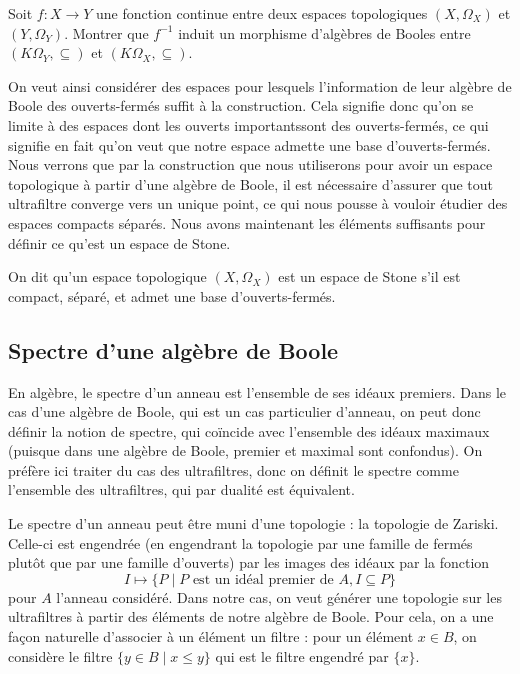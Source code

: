 \begin{exercise}
  Soit $f : X \to Y$ une fonction continue entre deux espaces topologiques
  $(X,\Omega_X)$ et $(Y,\Omega_Y)$. Montrer que $f^{-1}$ induit un morphisme
  d'algèbres de Booles entre $(K\Omega_Y,\subseteq)$ et
  $(K\Omega_X,\subseteq)$.
\end{exercise}

On veut ainsi considérer des espaces pour lesquels l'information de leur algèbre
de Boole des ouverts-fermés suffit à la construction. Cela signifie donc qu'on
se limite à des espaces dont les ouverts \og importants\fg sont des
ouverts-fermés, ce qui signifie en fait qu'on veut que notre espace admette une
base d'ouverts-fermés. Nous verrons que par la construction que nous utiliserons
pour avoir un espace topologique à partir d'une algèbre de Boole, il est
nécessaire d'assurer que tout ultrafiltre converge vers un unique point, ce qui
nous pousse à vouloir étudier des espaces compacts séparés. Nous avons
maintenant les éléments suffisants pour définir ce qu'est un espace de Stone.

\begin{definition}
  On dit qu'un espace topologique $(X,\Omega_X)$ est un espace de Stone s'il
  est compact, séparé, et admet une base d'ouverts-fermés.
\end{definition}

\subsection{Spectre d'une algèbre de Boole}

En algèbre, le spectre d'un anneau est l'ensemble de ses idéaux premiers. Dans
le cas d'une algèbre de Boole, qui est un cas particulier d'anneau, on peut donc
définir la notion de spectre, qui coïncide avec l'ensemble des idéaux maximaux
(puisque dans une algèbre de Boole, premier et maximal sont confondus). On
préfère ici traiter du cas des ultrafiltres, donc on définit le spectre comme
l'ensemble des ultrafiltres, qui par dualité est équivalent.

Le spectre d'un anneau peut être muni d'une topologie : la topologie de Zariski.
Celle-ci est engendrée (en engendrant la topologie par une famille de fermés
plutôt que par une famille d'ouverts) par les images des idéaux par la fonction
\[I \mapsto \{P\mid P\text{ est un idéal premier de } A, I\subseteq P\}\]
pour $A$ l'anneau considéré. Dans notre cas, on veut générer une topologie
sur les ultrafiltres à partir des éléments de notre algèbre de Boole. Pour cela,
on a une façon naturelle d'associer à un élément un filtre : pour un élément
$x\in B$, on considère le filtre $\{ y \in B \mid x \leq y\}$ qui est le filtre
engendré par $\{x\}$.

